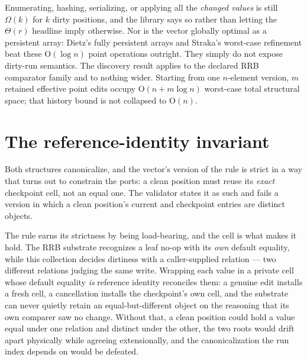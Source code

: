 \documentclass[11pt,twoside,openright]{book}
\newcommand{\bigoh}[1]{$\mathrm{O}(#1)$}
\begin{document}
\begin{caveatbox}
Enumerating, hashing, serializing, or applying all the \emph{changed values} is
still $\Omega(k)$ for $k$ dirty positions, and the library says so rather than
letting the $\Theta(r)$ headline imply otherwise. Nor is the vector globally
optimal as a persistent array: Dietz's fully persistent arrays and Straka's
worst-case refinement beat these \bigoh{\log n} point operations outright. They
simply do not expose dirty-run semantics. The discovery result applies to the
declared RRB comparator family and to nothing wider. Starting from one $n$-element
version, $m$ retained effective point edits occupy \bigoh{n + m \log n}
worst-case total structural space; that history bound is not collapsed to
\bigoh{n}.
\end{caveatbox}

\section{The reference-identity invariant}

Both structures canonicalize, and the vector's version of the rule is strict in
a way that turns out to constrain the ports: a clean position must reuse its
\emph{exact} checkpoint cell, not an equal one. The validator states it as such
and fails a version in which a clean position's current and checkpoint entries
are distinct objects.

The rule earns its strictness by being load-bearing, and the cell is what makes
it hold. The RRB substrate recognizes a leaf no-op with its \emph{own} default
equality, while this collection decides dirtiness with a caller-supplied
relation --- two different relations judging the same write. Wrapping each value
in a private cell whose default equality \emph{is} reference identity reconciles
them: a genuine edit installs a fresh cell, a cancellation installs the
checkpoint's own cell, and the substrate can never quietly retain an
equal-but-different object on the reasoning that its own comparer saw no change.
Without that, a clean position could hold a value equal under one relation and
distinct under the other, the two roots would drift apart physically while
agreeing extensionally, and the canonicalization the run index depends on would
be defeated.
\end{document}
